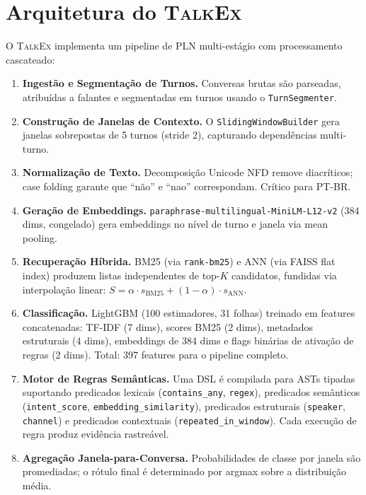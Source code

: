 \documentclass[11pt]{article}
\newcommand{\talkex}{\textsc{TalkEx}}
\begin{document}
\section{Arquitetura do \talkex{}}
\label{sec:architecture}

O \talkex{} implementa um pipeline de PLN multi-estágio com processamento cascateado:

\begin{enumerate}[leftmargin=*,itemsep=2pt]
    \item \textbf{Ingestão e Segmentação de Turnos.} Conversas brutas são parseadas, atribuídas a falantes e segmentadas em turnos usando o \texttt{TurnSegmenter}.
    \item \textbf{Construção de Janelas de Contexto.} O \texttt{SlidingWindowBuilder} gera janelas sobrepostas de 5 turnos (stride 2), capturando dependências multi-turno.
    \item \textbf{Normalização de Texto.} Decomposição Unicode NFD remove diacríticos; case folding garante que ``não'' e ``nao'' correspondam. Crítico para PT-BR.
    \item \textbf{Geração de Embeddings.} \texttt{paraphrase-multilingual-MiniLM-L12-v2} (384 dims, congelado) gera embeddings no nível de turno e janela via mean pooling.
    \item \textbf{Recuperação Híbrida.} BM25 (via \texttt{rank-bm25}) e ANN (via FAISS flat index) produzem listas independentes de top-$K$ candidatos, fundidas via interpolação linear: $S = \alpha \cdot s_{\text{BM25}} + (1-\alpha) \cdot s_{\text{ANN}}$.
    \item \textbf{Classificação.} LightGBM (100 estimadores, 31 folhas) treinado em features concatenadas: TF-IDF (7 dims), scores BM25 (2 dims), metadados estruturais (4 dims), embeddings de 384 dims e flags binárias de ativação de regras (2 dims). Total: 397 features para o pipeline completo.
    \item \textbf{Motor de Regras Semânticas.} Uma DSL é compilada para ASTs tipadas suportando predicados lexicais (\texttt{contains\_any}, \texttt{regex}), predicados semânticos (\texttt{intent\_score}, \texttt{embedding\_similarity}), predicados estruturais (\texttt{speaker}, \texttt{channel}) e predicados contextuais (\texttt{repeated\_in\_window}). Cada execução de regra produz evidência rastreável.
    \item \textbf{Agregação Janela-para-Conversa.} Probabilidades de classe por janela são promediadas; o rótulo final é determinado por argmax sobre a distribuição média.
\end{enumerate}
\end{document}
